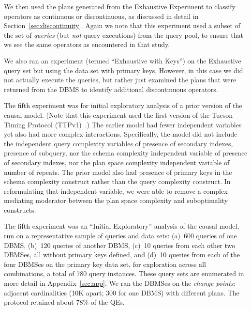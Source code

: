 \documentclass[prodmode,acmtods]{acmsmall}
\begin{document}
We then used the plans generated from the Exhaustive Experiment to classify operators as
continuous or discontinuous, as discussed in detail in
Section~\ref{sec:discontinuity}. Again we note that this experiment used a subset of
the set of {\em queries} (but {\em not} query executions) from the query pool,
to ensure that we see the same operators as encountered in that
study.

We also ran an experiment (termed ``Exhaustive with Keys'') on the Exhaustive query set but using the data
set with primary keys,  However, in this
case we did not actually execute 
the queries, but rather just examined the plans that were returned from the
\hbox{DBMS} to identify additional discontinuous operators. 

The fifth experiment was for initial exploratory analysis of a prior
version of the causal model. (Note that this experiment used
the first version of the Tucson Timing Protocol (TTPv1)~\cite{TTPv1}.)
The earlier model had fewer independent
variables yet also had more complex interactions. Specifically, the model
did not include the independent query complexity variables of presence of
secondary indexes, presence of subquery, nor the schema complexity
independent variable of presence of secondary indexes, nor the plan space
complexity independent variable of number of repeats. The prior model also
had presence of primary keys in the schema complexity construct rather than
the query complexity construct. In reformulating that independent variable,
we were able to remove a complex mediating moderator between the plan
space complexity and suboptimality constructs. 

The fifth experiment was an ``Initial Exploratory'' analysis of the causal model, run on
a representative sample of queries and data sets: (a)~600 queries of one
\hbox{DBMS}, (b)~120 queries of another \hbox{DBMS}, (c)~10 queries
from each other two \hbox{DBMSes}, all without primary keys defined, and (d)~10 queries
from each of the four \hbox{DBMSes} on the primary key data set, for exploration
across all combinations, a total of 780 query instances. These query sets
are enumerated in more detail in Appendix~\ref{sec:app}.
We ran the \hbox{DBMSes} on the {\em
  change points}: adjacent cardinalities (10K apart; 300 for one \hbox{DBMS}) with different
plans. The protocol retained about 78\% of the QEs.
\end{document}
